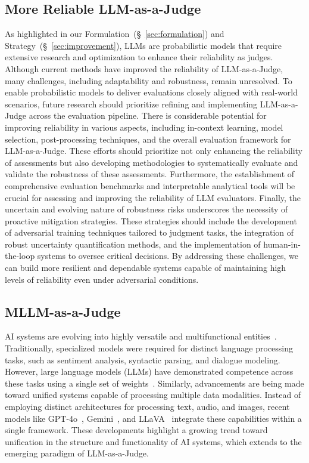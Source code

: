 \subsection{More Reliable LLM-as-a-Judge}
As highlighted in our Formulation~(\S~\ref{sec:formulation}) and Strategy~(\S~\ref{sec:improvement}), LLMs are probabilistic models that require extensive research and optimization to enhance their reliability as judges.
Although current methods have improved the reliability of LLM-as-a-Judge, many challenges, including adaptability and robustness, remain unresolved.
To enable probabilistic models to deliver evaluations closely aligned with real-world scenarios, future research should prioritize refining and implementing LLM-as-a-Judge across the evaluation pipeline.
There is considerable potential for improving reliability in various aspects, including in-context learning, model selection, post-processing techniques, and the overall evaluation framework for LLM-as-a-Judge. These efforts should prioritize not only enhancing the reliability of assessments but also developing methodologies to systematically evaluate and validate the robustness of these assessments. Furthermore, the establishment of comprehensive evaluation benchmarks and interpretable analytical tools will be crucial for assessing and improving the reliability of LLM evaluators.
Finally, the uncertain and evolving nature of robustness risks underscores the necessity of proactive mitigation strategies. These strategies should include the development of adversarial training techniques tailored to judgment tasks, the integration of robust uncertainty quantification methods, and the implementation of human-in-the-loop systems to oversee critical decisions. By addressing these challenges, we can build more resilient and dependable systems capable of maintaining high levels of reliability even under adversarial conditions.


\subsection{MLLM-as-a-Judge}

AI systems are evolving into highly versatile and multifunctional entities~\cite{inno_remote_sensing_data2024multimodal}. Traditionally, specialized models were required for distinct language processing tasks, such as sentiment analysis, syntactic parsing, and dialogue modeling. However, large language models (LLMs) have demonstrated competence across these tasks using a single set of weights~\cite{srivastava2022beyond}. Similarly, advancements are being made toward unified systems capable of processing multiple data modalities. Instead of employing distinct architectures for processing text, audio, and images, recent models like GPT-4o~\cite{openai2023gpt4}, Gemini~\cite{team2023gemini}, and LLaVA~\cite{liu2023llava} integrate these capabilities within a single framework. These developments highlight a growing trend toward unification in the structure and functionality of AI systems, which extends to the emerging paradigm of LLM-as-a-Judge. 

